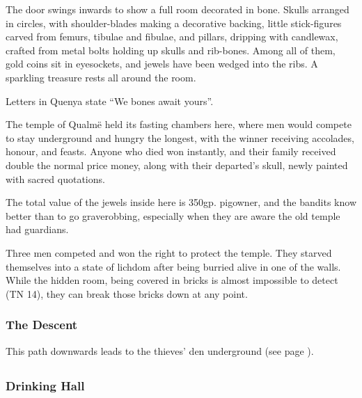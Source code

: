 \begin{boxtext}
	The door swings inwards to show a full room decorated in bone.  Skulls arranged in circles, with shoulder-blades making a decorative backing, little stick-figures carved from femurs, tibulae and fibulae, and pillars, dripping with candlewax, crafted from metal bolts holding up skulls and rib-bones.  Among all of them, gold coins sit in eyesockets, and jewels have been wedged into the ribs.  A sparkling treasure rests all around the room.

	Letters in Quenya state ``We bones await yours''.
\end{boxtext}

The temple of Qualm\"{e} held its fasting chambers here, where men would compete to stay underground and hungry the longest, with the winner receiving accolades, honour, and feasts.  Anyone who died won instantly, and their family received double the normal price money, along with their departed's skull, newly painted with sacred quotations.

The total value of the jewels inside here is 350gp.  \Gls{pigowner}, and the bandits know better than to go graverobbing, especially when they are aware the old temple had guardians.

Three men competed and won the right to protect the temple.  They starved themselves into a state of lichdom after being burried alive in one of the walls.  While the hidden room, being covered in bricks is almost impossible to detect (TN 14), they can break those bricks down at any point.


\demilich

\subsubsection{The Descent}
This path downwards leads to the thieves' den underground (see page \pageref{pigexit}).

\subsection{}



\subsubsection{Drinking Hall}


